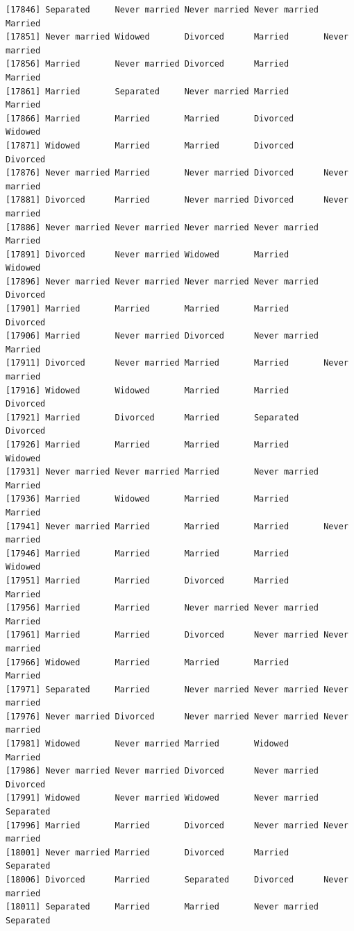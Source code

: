 \documentclass[
  letterpaper,
  DIV=11,
  numbers=noendperiod,
  oneside]{scrartcl}
\begin{document}
\begin{verbatim}
[17846] Separated     Never married Never married Never married Married      
[17851] Never married Widowed       Divorced      Married       Never married
[17856] Married       Never married Divorced      Married       Married      
[17861] Married       Separated     Never married Married       Married      
[17866] Married       Married       Married       Divorced      Widowed      
[17871] Widowed       Married       Married       Divorced      Divorced     
[17876] Never married Married       Never married Divorced      Never married
[17881] Divorced      Married       Never married Divorced      Never married
[17886] Never married Never married Never married Never married Married      
[17891] Divorced      Never married Widowed       Married       Widowed      
[17896] Never married Never married Never married Never married Divorced     
[17901] Married       Married       Married       Married       Divorced     
[17906] Married       Never married Divorced      Never married Married      
[17911] Divorced      Never married Married       Married       Never married
[17916] Widowed       Widowed       Married       Married       Divorced     
[17921] Married       Divorced      Married       Separated     Divorced     
[17926] Married       Married       Married       Married       Widowed      
[17931] Never married Never married Married       Never married Married      
[17936] Married       Widowed       Married       Married       Married      
[17941] Never married Married       Married       Married       Never married
[17946] Married       Married       Married       Married       Widowed      
[17951] Married       Married       Divorced      Married       Married      
[17956] Married       Married       Never married Never married Married      
[17961] Married       Married       Divorced      Never married Never married
[17966] Widowed       Married       Married       Married       Married      
[17971] Separated     Married       Never married Never married Never married
[17976] Never married Divorced      Never married Never married Never married
[17981] Widowed       Never married Married       Widowed       Married      
[17986] Never married Never married Divorced      Never married Divorced     
[17991] Widowed       Never married Widowed       Never married Separated    
[17996] Married       Married       Divorced      Never married Never married
[18001] Never married Married       Divorced      Married       Separated    
[18006] Divorced      Married       Separated     Divorced      Never married
[18011] Separated     Married       Married       Never married Separated    

\end{verbatim}
\end{document}
